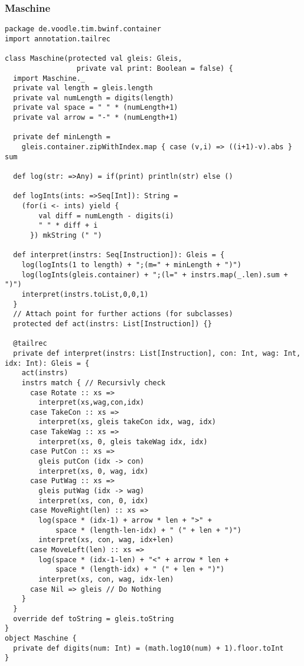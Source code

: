 \subsubsection{Maschine}
\begin{lstlisting}
package de.voodle.tim.bwinf.container
import annotation.tailrec

class Maschine(protected val gleis: Gleis,
                 private val print: Boolean = false) {
  import Maschine._
  private val length = gleis.length
  private val numLength = digits(length)
  private val space = " " * (numLength+1)
  private val arrow = "-" * (numLength+1)

  private def minLength =
    gleis.container.zipWithIndex.map { case (v,i) => ((i+1)-v).abs } sum

  def log(str: =>Any) = if(print) println(str) else ()
  
  def logInts(ints: =>Seq[Int]): String =
    (for(i <- ints) yield {
        val diff = numLength - digits(i)
        " " * diff + i
      }) mkString (" ")

  def interpret(instrs: Seq[Instruction]): Gleis = {
    log(logInts(1 to length) + ";(m=" + minLength + ")")
    log(logInts(gleis.container) + ";(l=" + instrs.map(_.len).sum + ")")
    interpret(instrs.toList,0,0,1)
  }
  // Attach point for further actions (for subclasses)
  protected def act(instrs: List[Instruction]) {}
  
  @tailrec
  private def interpret(instrs: List[Instruction], con: Int, wag: Int, idx: Int): Gleis = {
    act(instrs)
    instrs match { // Recursivly check
      case Rotate :: xs =>
        interpret(xs,wag,con,idx)
      case TakeCon :: xs =>
        interpret(xs, gleis takeCon idx, wag, idx)
      case TakeWag :: xs =>
        interpret(xs, 0, gleis takeWag idx, idx)
      case PutCon :: xs =>
        gleis putCon (idx -> con)
        interpret(xs, 0, wag, idx)
      case PutWag :: xs =>
        gleis putWag (idx -> wag)
        interpret(xs, con, 0, idx)
      case MoveRight(len) :: xs =>
        log(space * (idx-1) + arrow * len + ">" +
            space * (length-len-idx) + " (" + len + ")")
        interpret(xs, con, wag, idx+len)
      case MoveLeft(len) :: xs =>
        log(space * (idx-1-len) + "<" + arrow * len +
            space * (length-idx) + " (" + len + ")")
        interpret(xs, con, wag, idx-len)
      case Nil => gleis // Do Nothing
    }
  }
  override def toString = gleis.toString
}
object Maschine {
  private def digits(num: Int) = (math.log10(num) + 1).floor.toInt
}
\end{lstlisting}
\newpage
